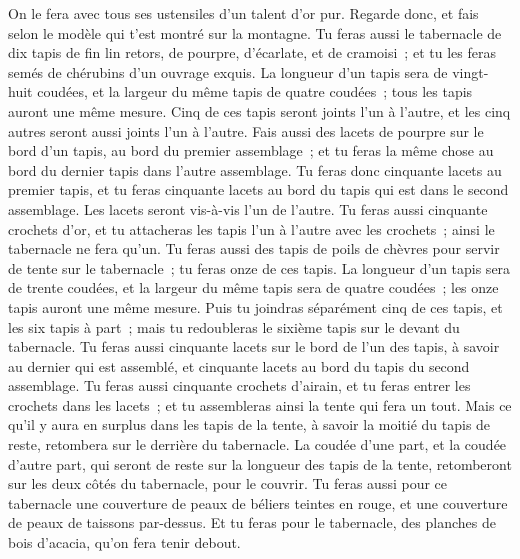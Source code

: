 \begin{multicols}{2}
On le fera avec tous ses ustensiles d'un talent d'or pur.
Regarde donc, et fais selon le modèle qui t'est montré sur la montagne.
\VerseOne{}Tu feras aussi le tabernacle de dix tapis de fin lin retors, de pourpre, d'écarlate, et de cramoisi~; et tu les feras semés de chérubins d'un ouvrage exquis.
La longueur d'un tapis sera de vingt-huit coudées, et la largeur du même tapis de quatre coudées~; tous les tapis auront une même mesure.
Cinq de ces tapis seront joints l'un à l'autre, et les cinq autres seront aussi joints l'un à l'autre.
Fais aussi des lacets de pourpre sur le bord d'un tapis, au bord du premier assemblage~; et tu feras la même chose au bord du dernier tapis dans l'autre assemblage.
Tu feras donc cinquante lacets au premier tapis, et tu feras cinquante lacets au bord du tapis qui est dans le second assemblage. Les lacets seront vis-à-vis l'un de l'autre.
Tu feras aussi cinquante crochets d'or, et tu attacheras les tapis l'un à l'autre avec les crochets~; ainsi le tabernacle ne fera qu'un.
Tu feras aussi des tapis de poils de chèvres pour servir de tente sur le tabernacle~; tu feras onze de ces tapis.
La longueur d'un tapis sera de trente coudées, et la largeur du même tapis sera de quatre coudées~; les onze tapis auront une même mesure.
Puis tu joindras séparément cinq de ces tapis, et les six tapis à part~; mais tu redoubleras le sixième tapis sur le devant du tabernacle.
Tu feras aussi cinquante lacets sur le bord de l'un des tapis, à savoir au dernier qui est assemblé, et cinquante lacets au bord du tapis du second assemblage.
Tu feras aussi cinquante crochets d'airain, et tu feras entrer les crochets dans les lacets~; et tu assembleras ainsi la tente qui fera un tout.
Mais ce qu'il y aura en surplus dans les tapis de la tente, à savoir la moitié du tapis de reste, retombera sur le derrière du tabernacle.
La coudée d'une part, et la coudée d'autre part, qui seront de reste sur la longueur des tapis de la tente, retomberont sur les deux côtés du tabernacle, pour le couvrir.
Tu feras aussi pour ce tabernacle une couverture de peaux de béliers teintes en rouge, et une couverture de peaux de taissons par-dessus.
Et tu feras pour le tabernacle, des planches de bois d'acacia, qu'on fera tenir debout.

\end{multicols}

